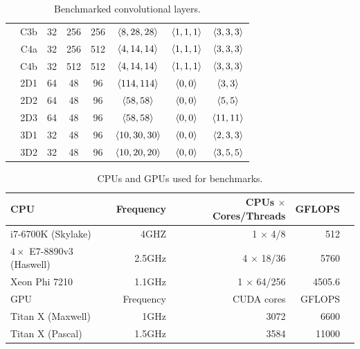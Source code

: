 \begin{table}
\begin{tabular}{cr !{\vrule width0.8pt} cccccc  }
      & C3b & 32  & 256 &  256 & $\langle8,28,28\rangle$ & $\langle1,1,1\rangle$ & $\langle3,3,3\rangle$ \\
      & C4a & 32  & 256 &  512 & $\langle4,14,14\rangle$ & $\langle1,1,1\rangle$ & $\langle3,3,3\rangle$ \\
      & C4b & 32  & 512 &  512 & $\langle4,14,14\rangle$ & $\langle1,1,1\rangle$ & $\langle3,3,3\rangle$ \\
      \hline
      & 2D1 & 64  & 48 &  96 & $\langle114,114\rangle$ & $\langle0,0\rangle$ & $\langle3,3\rangle$ \\
      & 2D2 & 64  & 48 &  96 & $\langle58,58\rangle$ & $\langle0,0\rangle$ & $\langle5,5\rangle$ \\
      & 2D3 & 64  & 48 &  96 & $\langle58,58\rangle$ & $\langle0,0\rangle$ & $\langle11,11\rangle$ \\
      & 3D1 & 32  & 48 &  96 & $\langle10,30,30\rangle$ & $\langle0,0\rangle$ & $\langle2,3,3\rangle$ \\
      & 3D2 & 32  & 48 &  96 & $\langle10,20,20\rangle$ & $\langle0,0\rangle$ & $\langle3,5,5\rangle$ \\
      \hline
    \end{tabular}
    \caption{Benchmarked convolutional layers.}
    \label{table:layers}
  \end{table}

  \begin{table}
    \begin{center}
      \setlength\tabcolsep{2.5pt}
      \begin{tabular}{lrrrr}
        \toprule
        CPU & Frequency & CPUs $\times$ Cores/Threads & GFLOPS\\
        \midrule
        i7-6700K (Skylake) & 4GHZ & 1 $\times$ 4/8 & 512\\
        $4\times$ E7-8890v3 (Haswell) & 2.5GHz & 4 $\times$ 18/36 & 5760\\
        Xeon Phi 7210 & 1.1GHz & 1 $\times$ 64/256 & 4505.6\\
        \toprule
        GPU & Frequency & CUDA cores & GFLOPS\\
        \midrule
        Titan X (Maxwell) & 1GHz & 3072 & 6600\\
        Titan X (Pascal) & 1.5GHz & 3584  &  11000\\
        \bottomrule
      \end{tabular}
    \end{center}
    \caption{CPUs and GPUs used for benchmarks.}
    \label{table:cpus}
  \end{table}



